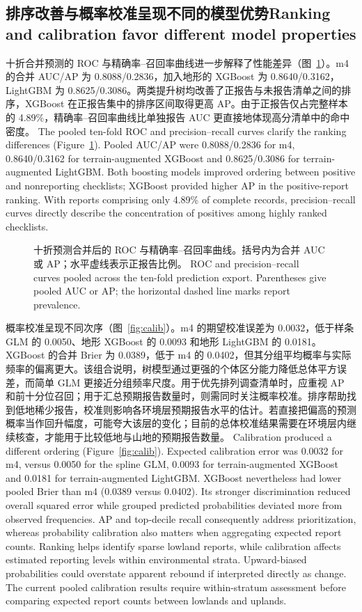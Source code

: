 \subsection{\ifzh 排序改善与概率校准呈现不同的模型优势\else Ranking and calibration favor different model properties\fi}
\ifzh
十折合并预测的 ROC 与精确率--召回率曲线进一步解释了性能差异（图~\ref{fig:curves}）。m4 的合并 AUC/AP 为 0.8088/0.2836，加入地形的 XGBoost 为 0.8640/0.3162，LightGBM 为 0.8625/0.3086。两类提升树均改善了正报告与未报告清单之间的排序，XGBoost 在正报告集中的排序区间取得更高 AP。由于正报告仅占完整样本的 4.89\%，精确率--召回率曲线比单独报告 AUC 更直接地体现高分清单中的命中密度。
\else
The pooled ten-fold ROC and precision--recall curves clarify the ranking differences (Figure~\ref{fig:curves}). Pooled AUC/AP were 0.8088/0.2836 for m4, 0.8640/0.3162 for terrain-augmented XGBoost and 0.8625/0.3086 for terrain-augmented LightGBM. Both boosting models improved ordering between positive and nonreporting checklists; XGBoost provided higher AP in the positive-report ranking. With reports comprising only 4.89\% of complete records, precision--recall curves directly describe the concentration of positives among highly ranked checklists.
\fi
\begin{figure}[htbp]\centering{}
\caption{\ifzh
十折预测合并后的 ROC 与精确率--召回率曲线。括号内为合并 AUC 或 AP；水平虚线表示正报告比例。
\else
ROC and precision--recall curves pooled across the ten-fold prediction export. Parentheses give pooled AUC or AP; the horizontal dashed line marks report prevalence.
\fi}\label{fig:curves}
\end{figure}
\ifzh
概率校准呈现不同次序（图~\ref{fig:calib}）。m4 的期望校准误差为 0.0032，低于样条 GLM 的 0.0050、地形 XGBoost 的 0.0093 和地形 LightGBM 的 0.0181。XGBoost 的合并 Brier 为 0.0389，低于 m4 的 0.0402，但其分组平均概率与实际频率的偏离更大。该组合说明，树模型通过更强的个体区分能力降低总体平方误差，而简单 GLM 更接近分组频率尺度。用于优先排列调查清单时，应重视 AP 和前十分位召回；用于汇总预期报告数量时，则需同时关注概率校准。排序帮助找到低地稀少报告，校准则影响各环境层预期报告水平的估计。若直接把偏高的预测概率当作回升幅度，可能夸大该层的变化；目前的总体校准结果需要在环境层内继续核查，才能用于比较低地与山地的预期报告数量。
\else
Calibration produced a different ordering (Figure~\ref{fig:calib}). Expected calibration error was 0.0032 for m4, versus 0.0050 for the spline GLM, 0.0093 for terrain-augmented XGBoost and 0.0181 for terrain-augmented LightGBM. XGBoost nevertheless had lower pooled Brier than m4 (0.0389 versus 0.0402). Its stronger discrimination reduced overall squared error while grouped predicted probabilities deviated more from observed frequencies. AP and top-decile recall consequently address prioritization, whereas probability calibration also matters when aggregating expected report counts. Ranking helps identify sparse lowland reports, while calibration affects estimated reporting levels within environmental strata. Upward-biased probabilities could overstate apparent rebound if interpreted directly as change. The current pooled calibration results require within-stratum assessment before comparing expected report counts between lowlands and uplands.
